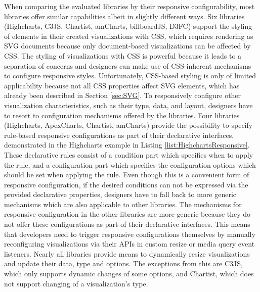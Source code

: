 When comparing the evaluated libraries by their responsive configurability, most libraries offer similar capabilities albeit in slightly different ways.
Six libraries (Highcharts, C3JS, Chartist, amCharts, billboardJS, D3FC) support the styling of elements in their created visualizations with CSS, which requires rendering as SVG documents because only document-based visualizations can be affected by CSS.
The styling of visualizations with CSS is powerful because it leads to a separation of concerns and designers can make use of CSS-inherent mechanisms to configure responsive styles.
Unfortunately, CSS-based styling is only of limited applicability because not all CSS properties affect SVG elements, which has already been described in Section \ref{sec:SVG}.
To responsively configure other visualization characteristics, such as their type, data, and layout, designers have to resort to configuration mechanisms offered by the libraries. 
Four libraries (Highcharts, ApexCharts, Chartist, amCharts) provide the possibility to specify rule-based responsive configurations as part of their declarative interfaces, demonstrated in the Highcharts example in Listing \ref{list:HighchartsResponsive}.
These declarative rules consist of a condition part which specifies when to apply the rule, and a configuration part which specifies the configuration options which should be set when applying the rule.
Even though this is a convenient form of responsive configuration, if the desired conditions can not be expressed via the provided declarative properties, designers have to fall back to more generic mechanisms which are also applicable to other libraries. 
The mechanisms for responsive configuration in the other libraries are more generic because they do not offer these configurations as part of their declarative interfaces. 
This means that developers need to trigger responsive configurations themselves by manually reconfiguring visualizations via their APIs in custom resize or media query event listeners.
Nearly all libraries provide means to dynamically resize visualizations and update their data, type and options.
The exceptions from this are C3JS, which only supports dynamic changes of some options, and Chartist, which does not support changing of a visualization's type.

\begin{samepage}
 example demonstrates how responsive rules can be declared to configure various aspects of a visualization in relation to the size of the viewport.
  },
]{listings/highcharts-responsive.js}
\end{samepage}